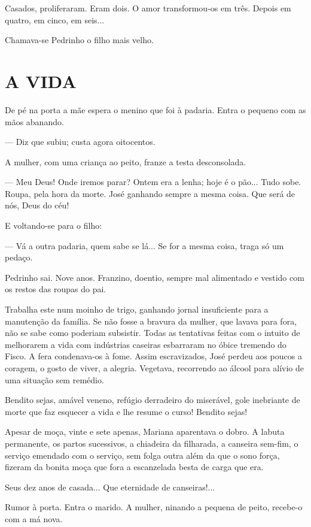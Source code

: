 Casados, proliferaram. Eram dois. O amor transformou-os em três. Depois
em quatro, em cinco, em seis...

Chamava-se Pedrinho o filho mais velho.

\section{A VIDA}

De pé na porta a mãe espera o menino que foi à padaria. Entra o pequeno
com as mãos abanando.

--- Diz que subiu; custa agora oitocentos.

A mulher, com uma criança ao peito, franze a testa desconsolada.

--- Meu Deus! Onde iremos parar? Ontem era a lenha; hoje é o pão... Tudo
sobe. Roupa, pela hora da morte. José ganhando sempre a mesma coisa. Que
será de nós, Deus do céu!

E voltando-se para o filho:

--- Vá a outra padaria, quem sabe se lá... Se for a mesma coisa, traga
só um pedaço.

Pedrinho sai. Nove anos. Franzino, doentio, sempre mal alimentado e
vestido com os restos das roupas do pai.

Trabalha este num moinho de trigo, ganhando jornal insuficiente para a
manutenção da família. Se não fosse a bravura da mulher, que lavava para
fora, não se sabe como poderiam subsistir. Todas as tentativas feitas
com o intuito de melhorarem a vida com indústrias caseiras esbarraram no
óbice tremendo do Fisco. A fera condenava-os à fome. Assim escravizados,
José perdeu aos poucos a coragem, o gosto de viver, a alegria. Vegetava,
recorrendo ao álcool para alívio de uma situação sem remédio.

Bendito sejas, amável veneno, refúgio derradeiro do miserável, gole
inebriante de morte que faz esquecer a vida e lhe resume o curso!
Bendito sejas!

Apesar de moça, vinte e sete apenas, Mariana aparentava o dobro. A
labuta permanente, os partos sucessivos, a chiadeira da filharada, a
canseira sem-fim, o serviço emendado com o serviço, sem folga outra além
da que o sono força, fizeram da bonita moça que fora a escanzelada besta
de carga que era.

Seus dez anos de casada... Que eternidade de canseiras!...

Rumor à porta. Entra o marido. A mulher, ninando a pequena de peito,
recebe-o com a má nova.

